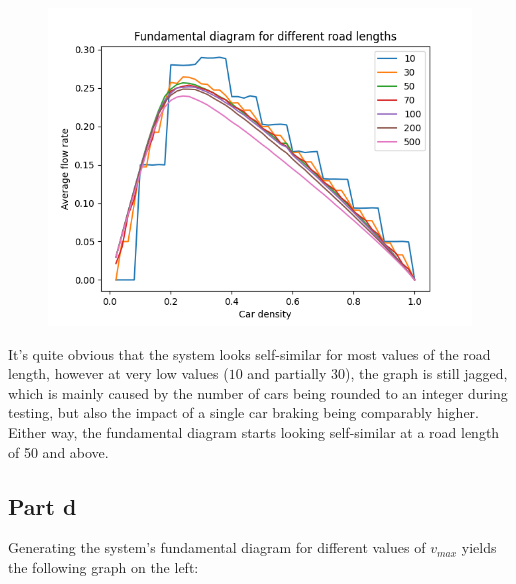 \documentclass[a4paper,12pt]{article}
\begin{document}
\begin{figure}
  \centering
  \includegraphics[scale=0.48]{img/2_2c_flowrate_density.png} %
\end{figure}

\FloatBarrier

It's quite obvious that the system looks self-similar for most values of the road length, however at very low values
($10$ and partially $30$), the graph is still jagged, which is mainly caused by the number of cars being rounded to
an integer during testing, but also the impact of a single car braking being comparably higher. Either way, the
fundamental diagram starts looking self-similar at a road length of 50 and above.

\subsection*{Part d}

Generating the system's fundamental diagram for different values of $v_{max}$ yields the following graph on the left:
\end{document}
